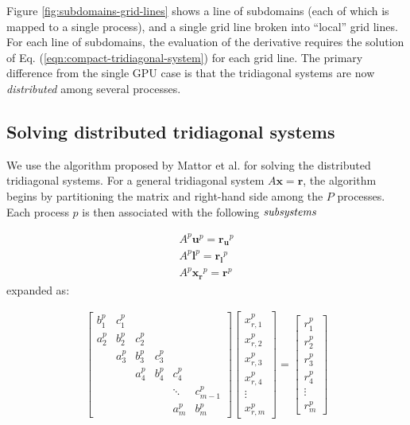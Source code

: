 \documentclass{elsarticle}
\begin{document}
Figure \ref{fig:subdomains-grid-lines}
shows a line of subdomains
(each of which is mapped to a single process),
and a single grid line
broken into ``local'' grid lines.
For each line of subdomains,
the evaluation of the derivative requires the solution
of Eq. (\ref{eqn:compact-tridiagonal-system})
for each grid line.
The primary difference from the single GPU case is that
the tridiagonal systems are now \emph{distributed}
among several processes.

\subsection{Solving distributed tridiagonal systems}

We use the algorithm
proposed by Mattor et al. \cite{mattor1995algorithm}
for solving the distributed tridiagonal systems.
For a general tridiagonal system $A\bm{x}=\bm{r}$,
the algorithm begins by partitioning
the matrix and right-hand side among the $P$ processes.
Each process $p$ is then associated with the
following $\emph{subsystems}$

\begin{align}
    & A^p\bm{u}^p = \bm{r_u}^p & \label{eqn:secondary-system-1} \\ 
    & A^p\bm{l}^p = \bm{r_l}^p & \label{eqn:secondary-system-2} \\
    & A^p\bm{x_r}^p = \bm{r}^p & \label{eqn:primary-system} 
\end{align}
%
expanded as:

\begin{align}
& \begin{bmatrix}
b_1^p & c_1^p \\
a_2^p & b_2^p & c_2^p \\
      & a_3^p & b_3^p & c_3^p \\
      &       & a_4^p & b_4^p & c_4^p \\
      &       &       &       &  \ddots & c_{m-1}^p\\
      &       &       &       &     a_{m}^p  & b_{m}^p
\end{bmatrix}
\begin{bmatrix}
x_{r,1}^p \\
x_{r,2}^p \\
x_{r,3}^p \\
x_{r,4}^p \\
\vdots \\
x_{r,m}^p
\end{bmatrix}
=
\begin{bmatrix}
r_1^p \\
r_2^p \\
r_3^p \\
r_4^p \\
\vdots \\
r_m^p
\end{bmatrix} & \label{eqn:primary-system-expanded} \\
\end{align}
\end{document}
